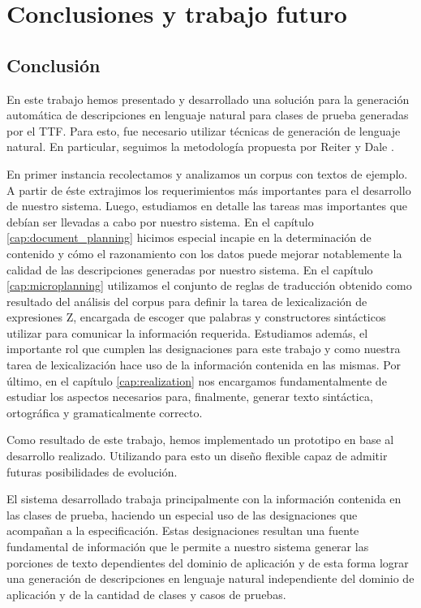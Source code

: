 \chapter{Conclusiones y trabajo futuro}
\label{cap:conclusion}

\section*{Conclusión}
En este trabajo hemos presentado y desarrollado una solución para la generación automática de descripciones en lenguaje natural para clases de prueba generadas por el TTF. Para esto, fue necesario utilizar técnicas de generación de lenguaje natural. En particular, seguimos la metodología propuesta por Reiter y Dale \cite{reiter_dale}.

En primer instancia recolectamos y analizamos un corpus con textos de ejemplo. A partir de éste extrajimos los requerimientos más importantes para el desarrollo de nuestro sistema. Luego, estudiamos en detalle las tareas mas importantes que debían ser llevadas a cabo por nuestro sistema. En el capítulo \ref{cap:document_planning} hicimos especial incapie en la determinación de contenido y cómo el razonamiento con los datos puede mejorar notablemente la calidad de las descripciones generadas por nuestro sistema. En el capítulo \ref{cap:microplanning} utilizamos el conjunto de reglas de traducción obtenido como resultado del análisis del corpus para definir la tarea de lexicalización de expresiones Z, encargada de escoger que palabras y constructores sintácticos utilizar para comunicar la información requerida. Estudiamos además, el importante rol que cumplen las designaciones para este trabajo y como nuestra tarea de lexicalización hace uso de la información contenida en las mismas. Por último, en el capítulo \ref{cap:realization} nos encargamos fundamentalmente de estudiar los aspectos necesarios para, finalmente, generar texto sintáctica, ortográfica y gramaticalmente correcto.

Como resultado de este trabajo, hemos implementado un prototipo en base al desarrollo realizado. Utilizando para esto un diseño flexible capaz de admitir futuras posibilidades de evolución. 

El sistema desarrollado trabaja principalmente con la información contenida en las clases de prueba, haciendo un especial uso de las designaciones que acompañan a la especificación. Estas designaciones resultan una fuente fundamental de información que le permite a nuestro sistema generar las porciones de texto dependientes del dominio de aplicación y de esta forma lograr una generación de descripciones en lenguaje natural independiente del dominio de aplicación y de la cantidad de clases y casos de pruebas.

